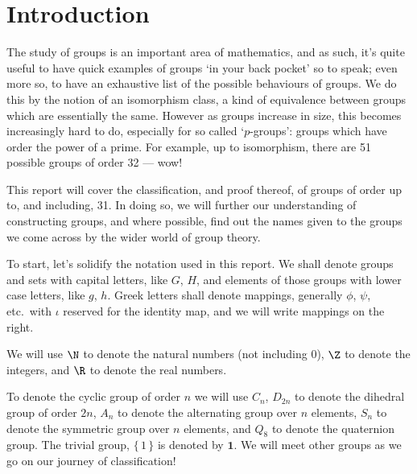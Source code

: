 \begin{table}
\begin{center}
    \end{center}
\end{table}


\section{Introduction}
The study of groups is an important area of mathematics, and as such, it's quite useful to have quick examples of groups
`in your back pocket' so to speak; even more so, to have an exhaustive list of the possible behaviours of groups.
We do this by the notion of an isomorphism class, a kind of equivalence between groups which are essentially the same.
However as groups increase in size, this becomes increasingly hard to do, especially for so called `\(p\)-groups':
groups which have order the power of a prime.
For example, up to isomorphism, there are 51 possible groups of order 32 --- wow!

This report will cover the classification, and proof thereof, of groups of order up to, and including, 31.
In doing so, we will further our understanding of constructing groups, and where possible, find out the names given to
the groups we come across by the wider world of group theory.

To start, let's solidify the notation used in this report.
We shall denote groups and sets with capital letters, like \(G\), \(H\), and elements of those groups with lower case
letters, like \(g\), \(h\).
Greek letters shall denote mappings, generally \(\phi\), \(\psi\), etc.\ with \(\iota\) reserved for the identity map,
and we will write mappings on the right.

We will use \(\N\) to denote the natural numbers (not including 0), \(\Z\) to denote the integers, and \(\R\) to denote
the real numbers.

To denote the cyclic group of order \(n\) we will use \(C_n\), \(D_{2n}\) to denote the dihedral group of order \(2n\),
\(A_n\) to denote the alternating group over \(n\) elements, \(S_n\) to denote the symmetric group over \(n\)
elements, and \(Q_8\) to denote the quaternion group.
The trivial group, \(\{\, 1\, \}\) is denoted by \(\bm{1}\).
We will meet other groups as we go on our journey of classification!

